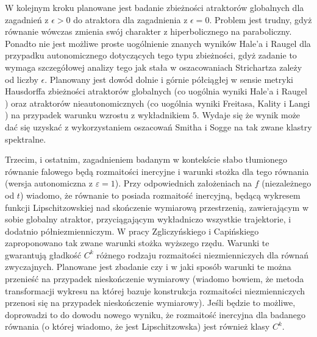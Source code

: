 \documentclass{amsproc}
\theoremstyle{definition}
\numberwithin{equation}{section}
\begin{document}
W kolejnym kroku planowane jest badanie zbieżności atraktorów globalnych dla zagadnień z $\epsilon>0$ do atraktora dla zagadnienia z $\epsilon=0$. Problem jest trudny, gdyż równanie wówczas zmienia swój charakter z hiperbolicznego na paraboliczny. Ponadto nie jest możliwe  proste uogólnienie znanych wyników Hale'a i Raugel \cite{Hale-Raugel-1988, Hale-Raugel-1990} dla przypadku autonomicznego dotyczących tego typu zbieżności, gdyż zadanie to wymaga szczegółowej analizy tego jak stała w oszacowaniach Strichartza zależy od liczby $\epsilon$. Planowany jest dowód dolnie i górnie półciągłej w sensie metryki Hausdorffa zbieżności atraktorów globalnych (co uogólnia wyniki Hale'a i Raugel \cite{Hale-Raugel-1988, Hale-Raugel-1990}) oraz atraktorów nieautonomicznych (co uogólnia wyniki Freitasa, Kality i Langi \cite{Fre_Kal_La}) na przypadek warunku wzrostu z wykładnikiem $5$. 
Wydaje się że wynik może dać się uzyskać z wykorzystaniem oszacowań Smitha i Sogge \cite{Smith_Sogge} na tak zwane klastry spektralne. 

Trzecim, i ostatnim, zagadnieniem badanym w kontekście słabo tłumionego równanie falowego będą rozmaitości inercyjne i warunki stożka dla tego równania (wersja autonomiczna z $\varepsilon=1$). Przy odpowiednich założeniach na $f$ (niezależnego od $t$) wiadomo, że równanie to posiada rozmaitość inercyjną, będącą wykresem funkcji Lipschitzowskiej nad skończenie wymiarową przestrzenią, zawierającym w sobie globalny atraktor, przyciągającym wykładniczo wszystkie trajektorie, i dodatnio półniezmienniczym. W pracy Zgliczyńskiego i Capińskiego \cite{cap}
zaproponowano tak zwane warunki stożka wyższego rzędu. Warunki te gwarantują gładkość $C^k$ różnego rodzaju rozmaitości niezmienniczych dla równań zwyczajnych. Planowane jest zbadanie czy i w jaki sposób warunki te można przenieść na przypadek nieskończenie wymiarowy (wiadomo bowiem, że metoda transformacji wykresu na której bazuje konstrukcja rozmaitości niezmienniczych przenosi się na przypadek nieskończenie wymiarowy). Jeśli będzie to możliwe, doprowadzi to do dowodu nowego wyniku, że rozmaitość inercyjna dla badanego równania (o której wiadomo, że jest Lipschitzowska) jest również klasy $C^k$. 


\end{document}
